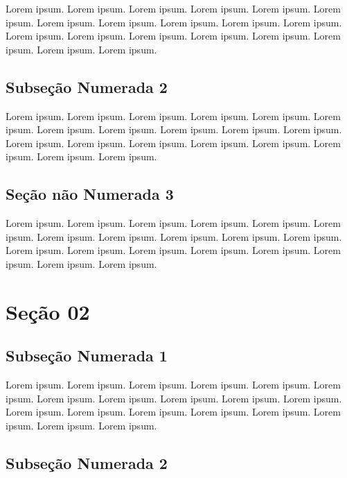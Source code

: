 \documentclass[
]{book}
\begin{document}
Lorem ipsum. Lorem ipsum. Lorem ipsum. Lorem ipsum. Lorem ipsum. Lorem ipsum. Lorem ipsum. Lorem ipsum. Lorem ipsum. Lorem ipsum. Lorem ipsum. Lorem ipsum. Lorem ipsum. Lorem ipsum. Lorem ipsum. Lorem ipsum. Lorem ipsum. Lorem ipsum. Lorem ipsum.

\hypertarget{subseuxe7uxe3o-numerada-2-2}{%
\subsection{Subseção Numerada 2}\label{subseuxe7uxe3o-numerada-2-2}}

Lorem ipsum. Lorem ipsum. Lorem ipsum. Lorem ipsum. Lorem ipsum. Lorem ipsum. Lorem ipsum. Lorem ipsum. Lorem ipsum. Lorem ipsum. Lorem ipsum. Lorem ipsum. Lorem ipsum. Lorem ipsum. Lorem ipsum. Lorem ipsum. Lorem ipsum. Lorem ipsum. Lorem ipsum.

\hypertarget{seuxe7uxe3o-nuxe3o-numerada-3-2}{%
\subsection*{Seção não Numerada 3}\label{seuxe7uxe3o-nuxe3o-numerada-3-2}}

Lorem ipsum. Lorem ipsum. Lorem ipsum. Lorem ipsum. Lorem ipsum. Lorem ipsum. Lorem ipsum. Lorem ipsum. Lorem ipsum. Lorem ipsum. Lorem ipsum. Lorem ipsum. Lorem ipsum. Lorem ipsum. Lorem ipsum. Lorem ipsum. Lorem ipsum. Lorem ipsum. Lorem ipsum.

\hypertarget{seuxe7uxe3o-02-1}{%
\section{Seção 02}\label{seuxe7uxe3o-02-1}}

\hypertarget{subseuxe7uxe3o-numerada-1-3}{%
\subsection{Subseção Numerada 1}\label{subseuxe7uxe3o-numerada-1-3}}

Lorem ipsum. Lorem ipsum. Lorem ipsum. Lorem ipsum. Lorem ipsum. Lorem ipsum. Lorem ipsum. Lorem ipsum. Lorem ipsum. Lorem ipsum. Lorem ipsum. Lorem ipsum. Lorem ipsum. Lorem ipsum. Lorem ipsum. Lorem ipsum. Lorem ipsum. Lorem ipsum. Lorem ipsum.

\hypertarget{subseuxe7uxe3o-numerada-2-3}{%
\subsection{Subseção Numerada 2}\label{subseuxe7uxe3o-numerada-2-3}}
\end{document}
